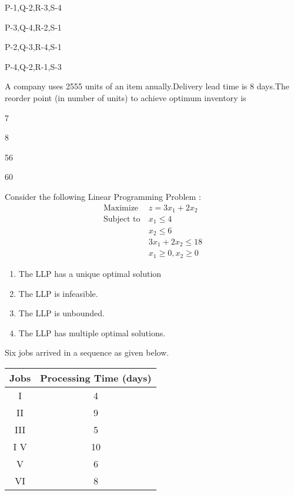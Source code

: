 \begin{enumerate}
\begin{multicols}{2}
\item P-1,Q-2,R-3,S-4
\item P-3,Q-4,R-2,S-1
\item P-2,Q-3,R-4,S-1
\item P-4,Q-2,R-1,S-3
\end{multicols}
\end{enumerate}
\item A company uses 2555 units of an item anually.Delivery lead time is 8 days.The reorder point (in number of units) to achieve optimum inventory is 
\begin{enumerate}
\begin{multicols}{4}
\item 7
\item 8
\item 56
\item 60
\end{multicols}
\end{enumerate}
\item Consider the following Linear Programming Problem  :
	\begin{align*}
		\text{Maximize} &\ z = 3x_1+2x_2 \\
		\text{Subject to} &\ x_1 \le 4 \\
		&\ x_2 \le 6 \\
		&\  3x_1+2x_2 \le 18 \\
		&\ x_1 \ge 0, x_2 \ge 0  
	\end{align*}
\begin{enumerate}
\item The LLP has a unique optimal solution 
\item The LLP is infeasible.
\item The LLP is unbounded.
\item The LLP has multiple optimal solutions.
\end{enumerate}
\item Six jobs arrived in a sequence as given below.
\begin{table}[h!]
        \centering
\begin{tabular}{|c|c|}

                                     \hline \textbf{
Jobs} & \textbf{Processing Time (days)} \\ \hline I &
 4 \\     \hline II & 9 \\ \hline III & 5 \\ \hline I
V & 10 \\ \hline V & 6 \\ \hline VI & 8 \\ \hline    
              
\end{tabular}
\end{table}
